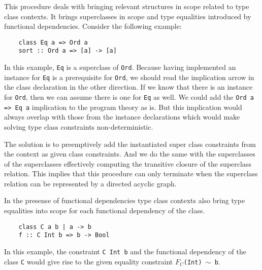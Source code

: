 This procedure deals with bringing relevant structures in scope related
to type class contexts. It brings superclasses in scope and type equalities
introduced by functional dependencies. Consider the following example:
\begin{verbatim}
    class Eq a => Ord a
    sort :: Ord a => [a] -> [a]
\end{verbatim}
In this example, \texttt{Eq} is a superclass of \texttt{Ord}. Because having
implemented an instance for \texttt{Eq} is a prerequisite for \texttt{Ord}, we
should read the implication arrow in the class declaration in the other
direction. If we know that there is an instance for \texttt{Ord}, then we can
assume there is one for \texttt{Eq} as well. We could add the \texttt{Ord a =>
Eq a} implication to the program theory as is. But this implication would
always overlap with those from the instance declarations which would make
solving type class constraints non-deterministic.

The solution is to preemptively add the instantiated super class constraints
from the context as given class constraints. And we do the same with the
superclasses of the superclasses effectively computing the transitive closure of
the superclass relation. This implies that this procedure can only terminate
when the superclass relation can be represented by a directed acyclic graph.

In the presense of functional dependencies type class contexts also bring type
equalities into scope for each functional dependency of the class.
\begin{verbatim}
    class C a b | a -> b
    f :: C Int b => b -> Bool
\end{verbatim}
In this example, the constraint \texttt{C Int b} and the functional dependency
of the class \texttt{C} would give rise to the given equality constraint
\texttt{$F_C$(Int) $\sim$ b}.

